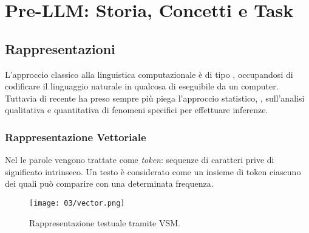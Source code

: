 \chapter{Pre-LLM: Storia, Concetti e Task}

\section{Rappresentazioni}

L'approccio classico alla linguistica computazionale è di tipo , occupandosi di codificare il linguaggio naturale in qualcosa di eseguibile da un computer. Tuttavia di recente ha preso sempre più piega l'approccio statistico, , sull'analisi qualitativa e quantitativa di fenomeni specifici per effettuare inferenze. 

\subsection{Rappresentazione Vettoriale}

Nel  le parole vengono trattate come \textit{token}: sequenze di caratteri prive di significato intrinseco. Un testo è considerato come un insieme di token ciascuno dei quali può comparire con una determinata frequenza. 


\begin{figure}[h]
    \centering
    \texttt{[image: 03/vector.png]}
    \caption{Rappresentazione testuale tramite VSM.}
    \label{fig:vec}
\end{figure}

